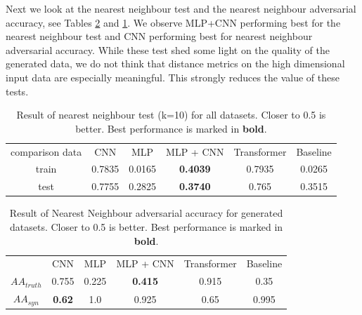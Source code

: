 Next we look at the nearest neighbour test and the nearest neighbour adversarial accuracy, see Tables \ref{Fig:nnacc} and \ref{Fig:nntest}. We observe MLP+CNN performing best for the nearest neighbour test and CNN performing best for nearest neighbour adversarial accuracy. While these test shed some light on the quality of the generated data, we do not think that distance metrics on the high dimensional input data are especially meaningful. This strongly reduces the value of these tests.


\begin{table}
  \centering
  \caption{Result of nearest neighbour test (k=10) for all datasets. Closer to 0.5 is better. Best performance is marked in \textbf{bold}.}
  \label{Fig:nntest}
  \begin{tabular}{c|ccccc}
    \toprule
comparison data &  CNN & MLP & MLP + CNN &Transformer & Baseline \\
   \cmidrule(r){1-6} 
train & 0.7835 & 0.0165 & \textbf{0.4039} & 0.7935 & 0.0265  \\
test &  0.7755 & 0.2825 & \textbf{0.3740} & 0.765 & 0.3515 \\


    \bottomrule
  \end{tabular}
\end{table}

\begin{table}
  \centering
  \caption{Result of Nearest Neighbour adversarial accuracy for generated datasets. Closer to 0.5 is better. Best performance is marked in \textbf{bold}.}
  \label{Fig:nnacc}
  \begin{tabular}{c ccccc}
    \toprule
  & CNN & MLP  & MLP + CNN & Transformer & Baseline \\

  \cmidrule(r){1-1}  \cmidrule(r){2-6} 
   $AA_{truth}$ & 0.755 & 0.225  & \textbf{0.415} & 0.915 & 0.35\\
   $AA_{syn}$& \textbf{0.62} & 1.0  & 0.925 &  0.65 & 0.995 \\


    \bottomrule
  \end{tabular}
\end{table}